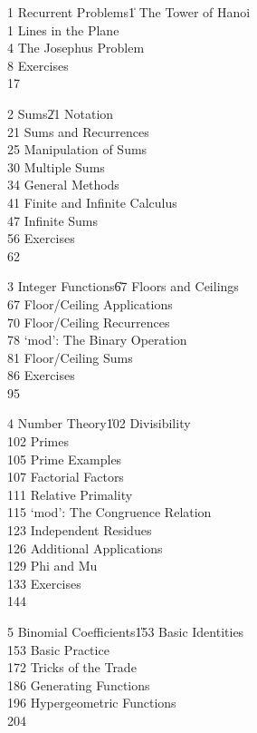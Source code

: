 \item1 Recurrent Problems\|1
The Tower of Hanoi\\1
Lines in the Plane\\4
The Josephus Problem\\8
\itemitem{}Exercises\\17
\item2 Sums\|21
Notation\\21
Sums and Recurrences\\25
Manipulation of Sums\\30
Multiple Sums\\34
General Methods\\41
Finite and Infinite Calculus\\47
Infinite Sums\\56
\itemitem{}Exercises\\62
\item3 Integer Functions\|67
Floors and Ceilings\\67
Floor/Ceiling Applications\\70
Floor/Ceiling Recurrences\\78
`mod': The Binary Operation\\81
Floor/Ceiling Sums\\86
\itemitem{}Exercises\\95
\item4 Number Theory\|102
Divisibility\\102
Primes\\105
Prime Examples\\107
Factorial Factors\\111
Relative Primality\\115
`mod': The Congruence Relation\\123
Independent Residues\\126
Additional Applications\\129
Phi and Mu\\133
\itemitem{}Exercises\\144
\item5 Binomial Coefficients\|153
Basic Identities\\153
Basic Practice\\172
Tricks of the Trade\\186
\eject
{}Generating Functions\\196
Hypergeometric Functions\\204
